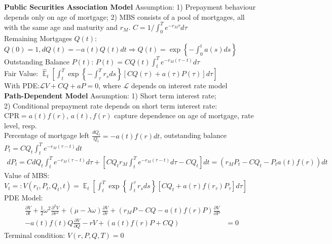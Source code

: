 \documentclass[12pt,landscape, a4paper]{article}
\theoremstyle{remark}
\newcommand{\E}{\operatorname{\mathbb{E}}}
\newcommand{\dd}{\partial}
\begin{document}
\begin{multicols*}{3}
\textbf{Public Securities Association Model} Assumption: 1) Prepayment behaviour depends only on age of mortgage; 2) MBS consists of a pool of mortgages, all with the same age and maturity and $r_M$. $C = 1 / \int^T_0 e^{-r_M \tau} d\tau$\\

Remaining Mortgages $Q(t)$: $Q(0) = 1, d Q(t) = -a (t) Q(t) dt \Rightarrow Q(t) = \exp \left\{-\int^t_0 a(s) ds \right\}$\\
Outstanding Balance $P(t)$: $P(t) = C Q(t) \int^T_t e^{-r_M (\tau - t)} d \tau$\\

Fair Value: $\hat{\E}_t \left[\int^T_t \exp \left\{-\int^T_\tau r_s ds \right\} \left[CQ (\tau) + a(\tau) P(\tau) \right] d\tau \right]$\\
With PDE:$\mathcal{L} V +CQ + aP = 0$, where $\mathcal{L}$ depends on interest rate model\\

\textbf{Path-Dependent Model} Assumption: 1) Short term interest rate; \\
2) Conditional prepayment rate depends on short term interest rate: $\mathrm{CPR} = a(t) f(r)$, $a(t), f(r)$ capture dependence on age of mortgage, rate level, resp.\\
Percentage of mortgage left $\frac{d Q_t}{Q_t} =  -a(t) f(r) dt$, outstanding balance $P_t = CQ_t \int^T_t e^{-r_M (\tau - t)}dt$
\begin{align*}
    dP_t = CdQ_t\int^T_t e^{-r_M(\tau-t)} d\tau  + \left[ C Q_t r_M \int^T_t e^{-r_M (\tau-t)} d\tau- CQ_t \right] dt = 
     (r_M P_t - CQ_t-P_t a(t) f(r)) dt
\end{align*}
Value of MBS: $V_t =: V(r_t, P_t, Q_t, t) = \hat{\E}_t \left[\int^T_t \exp \left\{\int^\tau_t r_s ds \right\} [CQ_t + a(\tau) f(r_{\tau} ) P_\tau] d\tau \right]$\\
PDE Model:
\begin{align*}
    \frac{\dd V}{\dd t} + \frac{1}{2} \omega^2 \frac{\dd^2 V}{\dd r^2} + (\mu - \lambda \omega) \frac{\dd V}{\dd r} +
    (r_M P -CQ -a(t) f(r)P) \frac{\dd V}{\dd P}&\\
    - a(t) f(t) Q \frac{\dd V}{\dd Q} -rV + (a(t) f(r) P +CQ)& = 0
\end{align*}
Terminal condition: $V(r, P, Q, T) = 0$

\end{multicols*}
\end{document}
